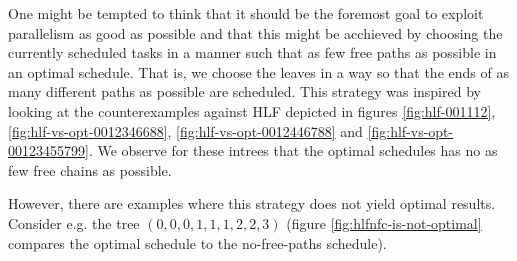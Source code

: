 One might be tempted to think that it should be the foremost goal to exploit parallelism as good as possible and that this might be acchieved by choosing the currently scheduled tasks in a manner such that as few free paths as possible in an optimal schedule. That is, we choose the leaves in a way so that the ends of as many different paths as possible are scheduled. This strategy was inspired by looking at the counterexamples against HLF depicted in figures \ref{fig:hlf-001112}, \ref{fig:hlf-vs-opt-0012346688}, \ref{fig:hlf-vs-opt-0012446788} and \ref{fig:hlf-vs-opt-00123455799}. We observe for these intrees that the optimal schedules has no as few free chains as possible.

However, there are examples where this strategy does not yield optimal results. Consider e.g. the tree $(0,0,0,1,1,1,2,2,3)$ (figure \ref{fig:hlfnfc-is-not-optimal} compares the optimal schedule to the no-free-paths schedule).

